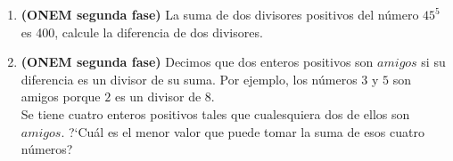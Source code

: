 \documentclass[10pt,a4 paper]{article}
\begin{document}
\begin{enumerate}
\item \textbf{(ONEM segunda fase)} La suma de dos divisores positivos del n\'umero $45^{5}$ es 400, calcule la diferencia de dos divisores.  

\item \textbf{(ONEM segunda fase)} Decimos que dos enteros positivos son $amigos$ si su diferencia es un divisor de su suma. Por ejemplo, los n\'umeros $3$ y $5$ son amigos porque $2$ es un divisor de $8$. \\
Se tiene cuatro enteros positivos tales que cualesquiera dos de ellos son $amigos$. ?`Cu\'al es el menor valor que puede tomar la suma de esos cuatro n\'umeros?


\end{enumerate}
\end{document}

